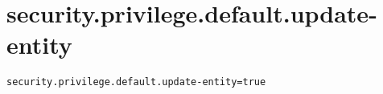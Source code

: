 \section{security.privilege.default.update-entity}
\label{configuration:SecurityPrivilegeDefaultUpdateEntity}
\ClearAPI
\TODO
{}
\begin{lstlisting}[style=Props,caption={Usage example for \textit{security.privilege.default.update-entity}}]
security.privilege.default.update-entity=true
\end{lstlisting}